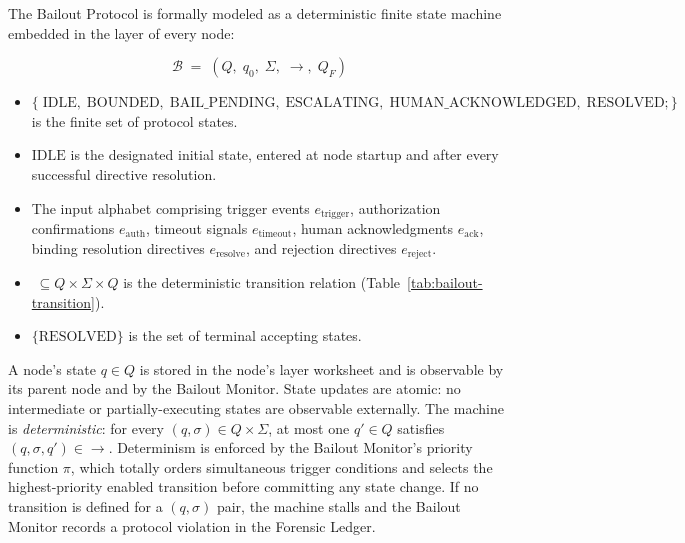 The Bailout Protocol is formally modeled as a deterministic finite state machine embedded in the \fact{} layer of every \bxthree{} node:

\[
\mathcal{B} \;=\; (Q,\; q_0,\; \Sigma,\; \rightarrow,\; Q_F)
\]

\begin{itemize}\itemsep=0pt
\item[$Q$] $\{\;\text{IDLE},\; \text{BOUNDED},\; \text{BAIL\_PENDING},\; \text{ESCALATING},\; \text{HUMAN\_ACKNOWLEDGED},\; \text{RESOLVED};\}$ is the finite set of protocol states.
\item[$q_0$] $\text{IDLE}$ is the designated initial state, entered at node startup and after every successful directive resolution.
\item[$\Sigma$] The input alphabet comprising trigger events $e_{\text{trigger}}$, authorization confirmations $e_{\text{auth}}$, timeout signals $e_{\text{timeout}}$, human acknowledgments $e_{\text{ack}}$, binding resolution directives $e_{\text{resolve}}$, and rejection directives $e_{\text{reject}}$.
\item[$\rightarrow$] $\; \subseteq Q \times \Sigma \times Q$ is the deterministic transition relation (Table~\ref{tab:bailout-transition}).
\item[$Q_F$] $\{\text{RESOLVED}\}$ is the set of terminal accepting states.
\end{itemize}

A node's state $q \in Q$ is stored in the node's \fact{} layer worksheet and is observable by its parent node and by the Bailout Monitor. State updates are atomic: no intermediate or partially-executing states are observable externally. The machine is \emph{deterministic}: for every $(q, \sigma) \in Q \times \Sigma$, at most one $q' \in Q$ satisfies $(q, \sigma, q') \in \rightarrow$. Determinism is enforced by the Bailout Monitor's priority function $\pi$, which totally orders simultaneous trigger conditions and selects the highest-priority enabled transition before committing any state change. If no transition is defined for a $(q, \sigma)$ pair, the machine stalls and the Bailout Monitor records a protocol violation in the Forensic Ledger.

